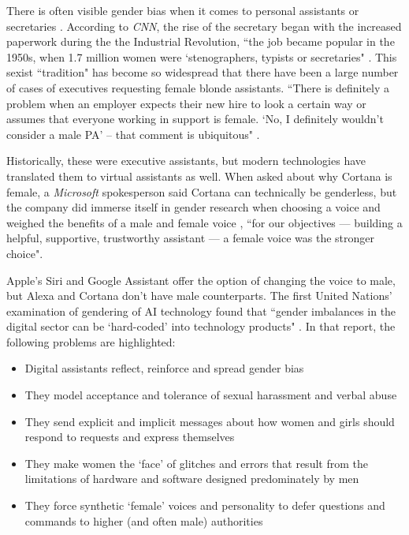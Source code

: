 \documentclass{article}
\begin{document}
There is often visible gender bias when it comes to personal assistants or secretaries \cite{noauthor_why_2018}. According to \emph{CNN}, the rise of the secretary began with the increased paperwork during the the Industrial Revolution, ``the job became popular in the 1950s, when 1.7 million women were ‘stenographers, typists or secretaries" \cite{noauthor_its_2013}. This sexist ``tradition" has become so widespread that there have been a large number of cases of executives requesting female blonde assistants. ``There is definitely a problem when an employer expects their new hire to look a certain way or assumes that everyone working in support is female. `No, I definitely wouldn’t consider a male PA' -- that comment is ubiquitous" \cite{williams_secretaries_2016}.

Historically, these were executive assistants, but modern technologies have translated them to virtual assistants as well. When asked about why Cortana is female, a \emph{Microsoft} spokesperson said Cortana can technically be genderless, but the company did immerse itself in gender research when choosing a voice and weighed the benefits of a male and female voice \cite{pcmag_real_2018}, ``for our objectives — building a helpful, supportive, trustworthy assistant — a female voice was the stronger choice".

Apple's Siri and Google Assistant offer the option of changing the voice to male, but Alexa and Cortana don't have male counterparts. The first United Nations' examination of gendering of AI technology found that ``gender imbalances in the digital sector can be `hard-coded' into technology products" \cite{noauthor_id_nodate}. In that report, the following problems are highlighted:

\begin{itemize}
  \item Digital assistants reflect, reinforce and spread gender bias
  \item They model acceptance and tolerance of sexual harassment and verbal abuse
  \item They send explicit and implicit messages about how women and girls should respond to requests and express themselves
  \item They make women the ‘face’ of glitches and errors that result from the limitations of hardware and software designed predominately by men
  \item They force synthetic ‘female’ voices and personality to defer questions and commands to higher (and often male) authorities
\end{itemize}
\end{document}
